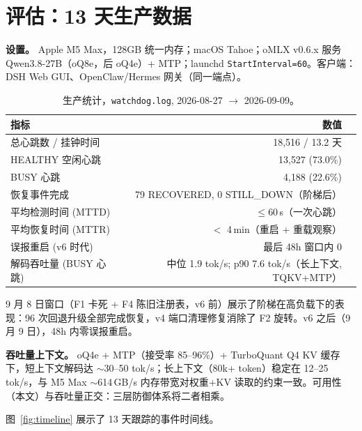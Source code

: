 \documentclass[10pt]{article}
\begin{document}
\section{评估：13 天生产数据}\label{sec:eval}

\noindent\textbf{设置。} Apple M5 Max，128GB 统一内存；macOS Tahoe；oMLX v0.6.x 服务 Qwen3.8-27B（oQ8e，后 oQ4e）+ MTP；launchd \texttt{StartInterval=60}。客户端：DSH Web GUI、OpenClaw/Hermes 网关（同一端点）。

\begin{table}[t]\centering
\small
\renewcommand{\arraystretch}{1.3}
\begin{tabular}{@{}lrr@{}}
\toprule
指标 & 数值 \\
\midrule
总心跳数 / 挂钟时间          & 18{,}516 / 13.2 天 \\
HEALTHY 空闲心跳               & 13{,}527 (73.0\%) \\
BUSY 心跳                       & 4{,}188 (22.6\%) \\
恢复事件完成        & 79 RECOVERED, 0 STILL\_DOWN（阶梯后） \\
平均检测时间 (MTTD)       & $\le 60$\,s（一次心跳） \\
平均恢复时间 (MTTR)      & $<$ 4\,min（重启 + 重载观察） \\
误报重启 (v6 时代) & 最后 48h 窗口内 0 \\
解码吞吐量 (BUSY 心跳)   & 中位 1.9 tok/s; p90 7.6 tok/s（长上下文, TQKV+MTP） \\
\bottomrule
\end{tabular}
\caption{生产统计，\texttt{watchdog.log}, 2026-08-27 $\rightarrow$ 2026-09-09。}
\label{tab:eval}
\end{table}

9 月 8 日窗口（F1 卡死 + F4 陈旧注册表，v6 前）展示了阶梯在高负载下的表现：96 次回退升级全部完成恢复，v4 端口清理修复消除了 F2 旋转。v6 之后（9 月 9 日），48h 内零误报重启。

\noindent\textbf{吞吐量上下文。} oQ4e + MTP（接受率 85--96\%）+ TurboQuant Q4 KV 缓存下，短上下文解码达 $\sim$30--50 tok/s；长上下文（80k+ token）稳定在 12--25 tok/s，与 M5 Max $\sim$614\,GB/s 内存带宽对权重+KV 读取的约束一致。可用性（本文）与吞吐量正交：三层防御体系将二者相乘。

图~\ref{fig:timeline} 展示了 13 天跟踪的事件时间线。
\end{document}
